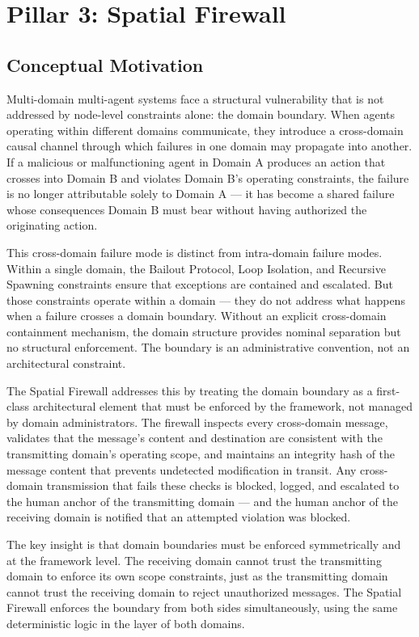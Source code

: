 \section{Pillar 3: Spatial Firewall}\label{sec:pillar-spatial-firewall}

\subsection{Conceptual Motivation}

Multi-domain multi-agent systems face a structural vulnerability that is not addressed by node-level constraints alone: the domain boundary. When agents operating within different domains communicate, they introduce a cross-domain causal channel through which failures in one domain may propagate into another. If a malicious or malfunctioning agent in Domain A produces an action that crosses into Domain B and violates Domain B's operating constraints, the failure is no longer attributable solely to Domain A — it has become a shared failure whose consequences Domain B must bear without having authorized the originating action.

This cross-domain failure mode is distinct from intra-domain failure modes. Within a single domain, the Bailout Protocol, Loop Isolation, and Recursive Spawning constraints ensure that exceptions are contained and escalated. But those constraints operate within a domain — they do not address what happens when a failure crosses a domain boundary. Without an explicit cross-domain containment mechanism, the domain structure provides nominal separation but no structural enforcement. The boundary is an administrative convention, not an architectural constraint.

The Spatial Firewall addresses this by treating the domain boundary as a first-class architectural element that must be enforced by the framework, not managed by domain administrators. The firewall inspects every cross-domain message, validates that the message's content and destination are consistent with the transmitting domain's operating scope, and maintains an integrity hash of the message content that prevents undetected modification in transit. Any cross-domain transmission that fails these checks is blocked, logged, and escalated to the human anchor of the transmitting domain — and the human anchor of the receiving domain is notified that an attempted violation was blocked.

The key insight is that domain boundaries must be enforced symmetrically and at the framework level. The receiving domain cannot trust the transmitting domain to enforce its own scope constraints, just as the transmitting domain cannot trust the receiving domain to reject unauthorized messages. The Spatial Firewall enforces the boundary from both sides simultaneously, using the same deterministic logic in the \fact{} layer of both domains.

